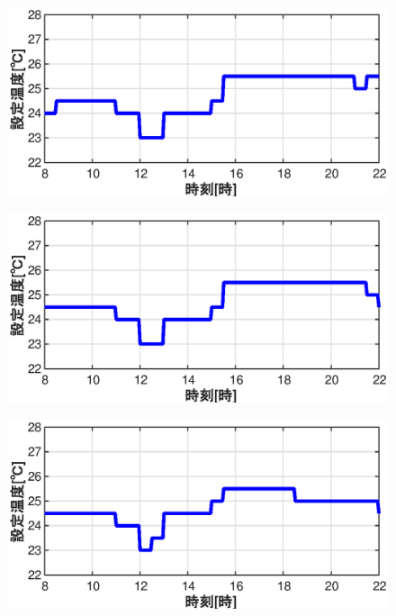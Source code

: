 \begin{figure}[htbp]
\begin{center}
\begin{minipage}{0.4\textwidth}
\begin{center}
        \includegraphics[width=1.0\textwidth,keepaspectratio=true]{fig/math_result_schedule_settemp_c.eps}\\
      \end{center}
    \end{minipage}
    \begin{minipage}{0.4\textwidth}
      \begin{center}
        \includegraphics[width=1.0\textwidth,keepaspectratio=true]{fig/math_result_schedule_settemp_d.eps}\\
      \end{center}
    \end{minipage}
    \begin{minipage}{0.4\textwidth}
      \begin{center}
        \includegraphics[width=1.0\textwidth,keepaspectratio=true]{fig/math_result_schedule_settemp_e.eps}\\

\end{center}
\end{minipage}
\end{center}
\end{figure}
